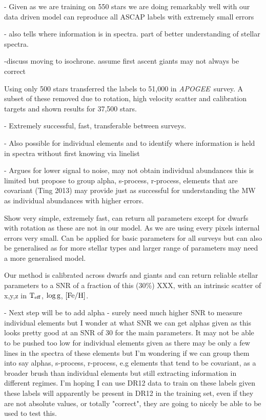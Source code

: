 \documentclass[12pt, preprint]{aastex}
\newcommand{\teff}{\mbox{$\rm T_{eff}$}}
\newcommand{\feh}{\mbox{$\rm [Fe/H]$}}
\newcommand{\logg}{\mbox{$\rm \log g$}}
\newcommand{\apogee}{\textsl{APOGEE}}
\begin{document}
- Given as we are training on 550 stars we are doing remarkably well with our data driven model can reproduce all ASCAP labels with extremely small errors

- also tells where information is in spectra. part of better understanding of stellar spectra. 

-discuss moving to isochrone. assume first ascent giants may not always be correct

Using only 500 stars transferred the labels to 51,000 in \apogee\ survey. A subset of these removed due to rotation, high velocity scatter and calibration targets and shown results for 37,500 stars. 

- Extremely successful, fast, transferable between surveys. 

- Also possible for individual elements and to identify where information is held in spectra without first knowing via linelist

- Argues for lower signal to noise, may not obtain individual abundances this is limited but propose to group alpha, s-process, r-process, elements that are covariant (Ting 2013) may provide just as successful for understanding the MW as individual abundances with higher errors. 



Show very simple, extremely fast, can return all parameters except for dwarfs with rotation as these are not in our model. As we are using every pixels internal errors very small. Can be applied for basic parameters for all surveys but can also be generalised as for more stellar types and larger range of parameters may need a more generalised model. 


Our method is calibrated across dwarfs and giants and can return reliable stellar parameters to a SNR of a fraction of this (30\%) XXX, with an intrinsic scatter of x,y,z in \teff, \logg, \feh.

- Next step will be to add alpha - surely need much higher SNR to measure individual elements but 
I wonder at what SNR we can get alphas given as this looks pretty good at an SNR of 30 for the main parameters. It may not be able to be pushed too low for individual elements given as there may be only a few lines in the spectra of these elements but I'm wondering if we can group them into say alphas, s-process, r-process, e.g elements that tend to be covariant, as a broader brush than individual elements but still extracting information in different regimes. I'm hoping I can use DR12 data to train on these labels given these labels will apparently be present in DR12 in the training set, even if they are not absolute values, or totally "correct", they are going to nicely be able to be used to test this. 
\end{document}
